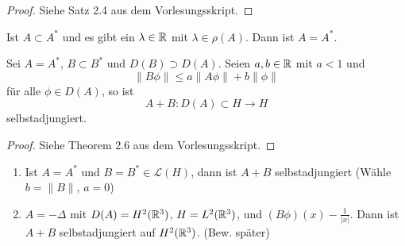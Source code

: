 \documentclass{mycourse}
\begin{document}
\begin{proof}
Siehe Satz 2.4 aus dem Vorlesungsskript.
\end{proof}
\begin{kor}
Ist $A\subset A^*$ und es gibt ein $\lambda \in \mathbb{R}$ mit $\lambda \in\rho(A)$. Dann ist $A=A^*$.
\end{kor}
\begin{st}
Sei $A=A^*$, $B\subset B^*$ und $D(B) \supset D(A)$. Seien $a,b\in \mathbb{R}$ mit $a<1$ und
\[
\|B\phi\| \le a \| A\phi\| + b \| \phi \|
\]
für alle $\phi \in D(A)$, so ist
\[
A+B: D(A) \subset H  \to H
\]
selbstadjungiert.
\end{st}
\begin{proof}
Siehe Theorem 2.6 aus dem Vorlesungsskript.
\end{proof}

\begin{ex*}
\begin{enumerate}[1)]
\item Ist $A=A^*$ und $B=B^*\in \mathcal L(H)$, dann ist $A+B$ selbstadjungiert (Wähle $b=\| B\|$, $a=0$)
\item $A=-\Delta$ mit $D(A) = H^2(\mathbb{R}^3)$, $H=L^2(\mathbb{R}^3)$, und $(B\phi)(x) -\frac{1}{|x|}$. Dann ist $A+B$ selbstadjungiert auf $H^2(\mathbb{R}^3)$. (Bew. später)
\end{enumerate}
\end{ex*}
\end{document}
